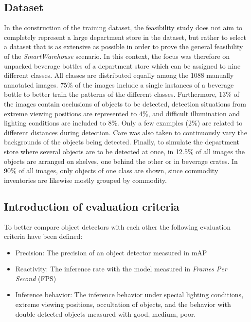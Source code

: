 \documentclass[a4paper, 10pt, journal]{wissarbIEEE}      %
\begin{document}
\subsection{Dataset}

In the construction of the training dataset, the feasibility study does not aim to completely represent a large department store in the dataset, but rather to select a dataset that is as extensive as possible in order to prove the general feasibility of the \textit{SmartWarehouse} scenario. In this context, the focus was therefore on unpacked beverage bottles of a department store which can be assigned to nine different classes. All classes are distributed equally among the 1088 manually annotated images. 75\% of the images include a single instances of a beverage bottle to better train the patterns of the different classes. Furthermore, 13\% of the images contain occlusions of objects to be detected, detection situations from extreme viewing positions are represented to 4\%, and difficult illumination and lighting conditions are included to 8\%. Only a few examples (2\%) are related to different distances during detection. Care was also taken to continuously vary the backgrounds of the objects being detected. Finally, to simulate the department store where several objects are to be detected at once, in 12.5\% of all images the objects are arranged on shelves, one behind the other or in beverage crates. In 90\% of all images, only objects of one class are shown, since commodity inventories are likewise mostly grouped by commodity. 

\subsection{Introduction of evaluation criteria}

To better compare object detectors with each other the following evaluation criteria have been defined:

\begin{itemize}
	\item Precision: The precision of an object detector measured in mAP
	\item Reactivity: The inference rate with the model measured in \textit{Frames Per Second} (FPS)
	\item Inference behavior: The inference behavior under special lighting conditions, extreme viewing positions, occultation of objects, and the behavior with double detected objects measured with good, medium, poor. 
\end{itemize}
\end{document}
